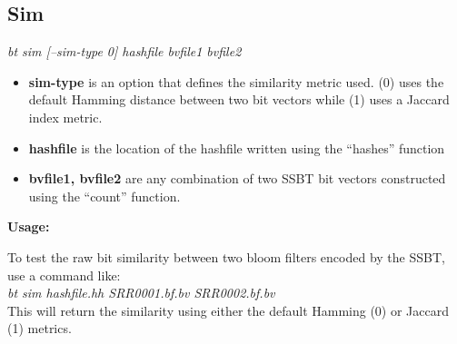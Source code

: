 \documentclass{article}
\begin{document}
\subsection{Sim}
\textit{bt sim [--sim-type 0] hashfile bvfile1 bvfile2}
\begin{itemize}
\item \textbf{sim-type} is an option that defines the similarity metric used. (0) uses the default Hamming distance between two bit vectors while (1) uses a Jaccard index metric.
\item \textbf{hashfile} is the location of the hashfile written using the ``hashes'' function
\item \textbf{bvfile1, bvfile2} are any combination of two SSBT bit vectors constructed using the ``count'' function.
\end{itemize}
\textbf{Usage:}

To test the raw bit similarity between two bloom filters encoded by the SSBT, use a command like: \\

\textit{bt sim hashfile.hh SRR0001.bf.bv SRR0002.bf.bv} \\

This will return the similarity using either the default Hamming (0) or Jaccard (1) metrics.
\end{document}
